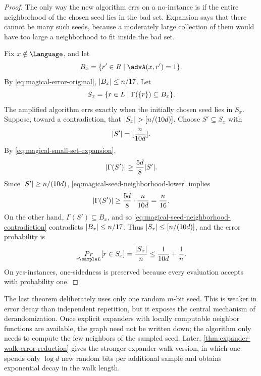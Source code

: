 \begin{proof}
	The only way the new algorithm errs on a no-instance is if the entire neighborhood of the chosen seed lies in the bad set. Expansion says that there cannot be many such seeds, because a moderately large collection of them would have too large a neighborhood to fit inside the bad set.

	Fix \(x\notin \Language\), and let
	\begin{equation}
		\label{eq:magical-bad-set}
		B_x=\{r'\in\RightSet\mid \advA(x,r')=1\}.
	\end{equation}
	By \cref{eq:magical-error-original}, \(\lvert B_x\rvert\leq n/17\). Let
	\begin{equation}
		\label{eq:magical-seed-set}
		S_x=\{r\in L\mid \Gamma(\{r\})\subseteq B_x\}.
	\end{equation}
	The amplified algorithm errs exactly when the initially chosen seed lies in \(S_x\). Suppose, toward a contradiction, that \(\lvert S_x\rvert>[ n/(10d)]\). Choose \(S'\subseteq S_x\) with
	\begin{equation}
		\label{eq:magical-seed-subset-size}
		\lvert S'\rvert=[ \frac{n}{10d}].
	\end{equation}
	By \cref{eq:magical-small-set-expansion},
	\begin{equation}
		\label{eq:magical-seed-neighborhood-lower}
		\lvert\Gamma(S')\rvert\geq \frac{5d}{8}\lvert S'\rvert.
	\end{equation}
	Since \(\lvert S'\rvert\geq n/(10d)\), \cref{eq:magical-seed-neighborhood-lower} implies
	\begin{equation}
		\label{eq:magical-seed-neighborhood-contradiction}
		\lvert\Gamma(S')\rvert\geq \frac{5d}{8}\cdot \frac{n}{10d}=\frac{n}{16}.
	\end{equation}
	On the other hand, \(\Gamma(S')\subseteq B_x\), and so \cref{eq:magical-seed-neighborhood-contradiction} contradicts \(\lvert B_x\rvert\leq n/17\). Thus \(\lvert S_x\rvert\leq [ n/(10d)]\), and the error probability is
	\begin{equation}
		\label{eq:magical-error-final}
		\Pr_{r\sample\LeftSet}[r\in S_x]
		=\frac{\abs{S_x}}{n}
		\leq \frac{1}{10d}+\frac{1}{n}.
	\end{equation}
	On yes-instances, one-sidedness is preserved because every evaluation accepts with probability one.
\end{proof}

The last theorem deliberately uses only one random \(m\)-bit seed. This is weaker in error decay than independent repetition, but it exposes the central mechanism of derandomization. Once explicit expanders with locally computable neighbor functions are available, the graph need not be written down; the algorithm only needs to compute the few neighbors of the sampled seed. Later, \cref{thm:expander-walk-error-reduction} gives the stronger expander-walk version, in which one spends only \(\log d\) new random bits per additional sample and obtains exponential decay in the walk length.
